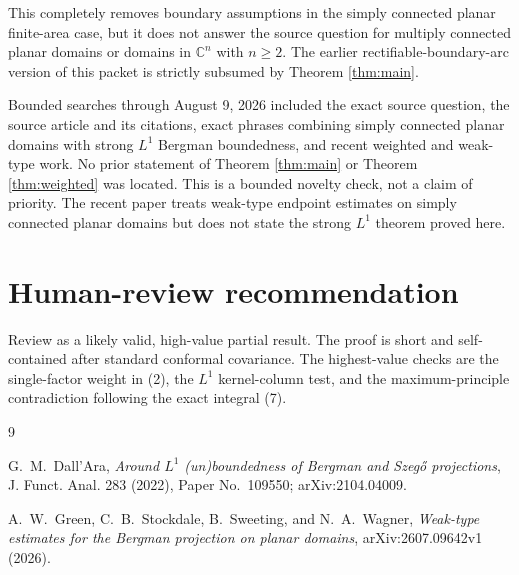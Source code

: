 \documentclass[11pt]{article}
\newcommand{\C}{\mathbb C}
\begin{document}
This completely removes boundary assumptions in the simply connected planar
finite-area case, but it does not answer the source question for multiply
connected planar domains or domains in $\C^n$ with $n\ge2$.  The earlier
rectifiable-boundary-arc version of this packet is strictly subsumed by
Theorem \ref{thm:main}.

Bounded searches through August 9, 2026 included the exact source question,
the source article and its citations, exact phrases combining simply
connected planar domains with strong $L^1$ Bergman boundedness, and recent
weighted and weak-type work.  No prior statement of Theorem \ref{thm:main}
or Theorem \ref{thm:weighted} was located.  This is a bounded novelty check,
not a claim of priority.  The recent paper \cite{GSW} treats weak-type
endpoint estimates on simply connected planar domains but does not state the
strong $L^1$ theorem proved here.

\section*{Human-review recommendation}

Review as a likely valid, high-value partial result.  The proof is short and
self-contained after standard conformal covariance.  The highest-value checks
are the single-factor weight in (2), the $L^1$ kernel-column test, and the
maximum-principle contradiction following the exact integral (7).

\begin{thebibliography}{9}

G.~M.~Dall'Ara,
\emph{Around $L^1$ (un)boundedness of Bergman and Szeg\H{o} projections},
J. Funct. Anal. 283 (2022), Paper No.~109550; arXiv:2104.04009.

A.~W.~Green, C.~B.~Stockdale, B.~Sweeting, and N.~A.~Wagner,
\emph{Weak-type estimates for the Bergman projection on planar domains},
arXiv:2607.09642v1 (2026).

\end{thebibliography}
\end{document}
